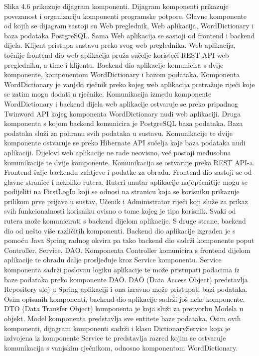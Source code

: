 			 Slika 4.6 prikazuje dijagram komponenti. Dijagram komponenti prikazuje povezanost i organizaciju komponenti programske potpore. Glavne komponente od kojih se dijagram sastoji su Web preglednik, Web aplikacija, WordDictionary i baza podataka PostgreSQL. Sama Web aplikacija se sastoji od frontend i backend dijela. Klijent pristupa sustavu preko svog web preglednika. Web aplikacija, točnije frontend dio web aplikacija pruža sučelje koristeći REST API web pregledniku, a time i klijentu. Backend dio aplikacije komunicira s dvije komponente, komponentom WordDictionary i bazom podataka. Komponenta WordDictionary je vanjski rječnik preko kojeg web aplikacija pretražuje riječi koje se zatim mogu dodati u rječnike. Komunikacija između komponente WordDictionary i backend dijela web aplikacije ostvaruje se preko pripadnog Twinword API kojeg komponenta WordDictionary nudi web aplikaciji. Druga komponenta s kojom backend komunicira je PostgreSQL baza podataka. Baza podataka služi za pohranu svih podataka u sustavu. Komunikacije te dvije komponente ostvaruje se preko Hibernate API sučelja koje baza podataka nudi aplikaciji. Dijelovi web aplikacije ne rade neovisno, već postoji međusobna komunikacije te dvije komponente. Komunikacija se ostvaruje preko REST API-a. Frontend šalje backendu zahtjeve i podatke za obradu. Frontend dio sastoji se od glavne stranice i nekoliko rutera. Ruteri unutar aplikacije najopćenitije mogu se podijeliti na FirstLogIn koji se odnosi na stranicu koja se korisniku prikazuje prilikom prve prijave u sustav, Učenik i Administrator riječi koji služe za prikaz svih funkcionalnosti korisniku ovisno o tome kojeg je tipa korisnik. Svaki od rutera može komunicirati s backend dijelom aplikacije. S druge strane, backend dio od nešto više različitih komponenti. Backend dio aplikacije izgrađen je s pomoću Java Spring radnog okvira pa tako backend dio sadrži komponente poput Controller, Service, DAO. Komponenta Controller komunicira s frontend dijelom aplikacije te obradu dalje prosljeđuje kroz Service komponentu. Service komponenta sadrži poslovnu logiku aplikacije te može pristupati podacima iz baze podataka preko komponente DAO. DAO (Data Access Object) predstavlja Repository sloj u Spring aplikaciji i ona izravno može pristupati bazi podataka. Osim opisanih komponenti, backend dio aplikacije sadrži još neke komponente. DTO (Data Transfer Object) komponenta je koja služi za pretvorbu Modela u objekt. Model komponenta predstavlja sve entitete baze podataka. Osim ovih komponenti, dijagram komponenti sadrži i klasu DictionaryService koja je izdvojena iz komponente Service te predstavlja razred kojim se ostvaruje komunikacija s vanjskim rječnikom, odnosno komponentom WordDictionary.
			 